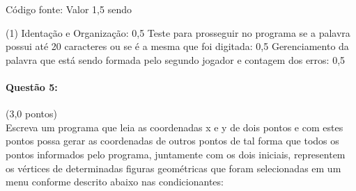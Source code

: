 \documentclass[12pt,a4paper]{article}
\begin{document}
Código fonte: Valor 1,5 sendo
\begin{tasks}(1)
\task Identação e Organização: 0,5
\task Teste para prosseguir no programa se a palavra possui até 20 caracteres ou se é a mesma que foi digitada: 0,5
\task Gerenciamento da palavra que está sendo formada pelo segundo jogador e contagem dos erros: 0,5
\end{tasks}
\paragraph{Questão 5:}(3,0 pontos)\\
Escreva um programa que leia as coordenadas x e y de dois pontos e com estes pontos possa gerar as coordenadas de outros pontos de tal forma que todos os pontos informados pelo programa, juntamente com os dois iniciais, representem os vértices de determinadas figuras geométricas que foram selecionadas em um menu conforme descrito abaixo nas condicionantes:
\end{document}
